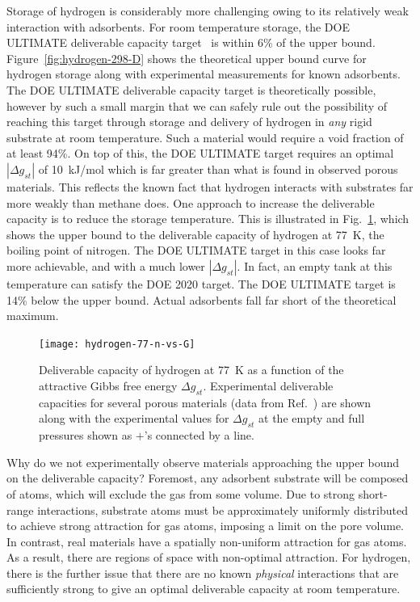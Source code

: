 \documentclass[twoside,twocolumn,9pt]{article}
\newcommand\gst{\ensuremath{\Delta g_{st}}}
\begin{document}
Storage of hydrogen is considerably more challenging owing to its relatively
weak interaction with adsorbents. For room temperature storage, the DOE
ULTIMATE deliverable capacity target~\cite{DOE} is within 6\% of the upper
bound. Figure~\ref{fig:hydrogen-298-D} shows the theoretical upper bound curve
for hydrogen storage along with experimental measurements for known adsorbents. The
DOE ULTIMATE deliverable capacity target is theoretically possible, however by
such a small margin that we can safely rule out the possibility of reaching
this target through storage and delivery of hydrogen in \emph{any} rigid
substrate at room temperature. Such a material would require a void fraction of
at least 94\%. On top of this, the DOE ULTIMATE target requires an optimal
$|\gst|$ of 10~kJ/mol which is far greater than what is found in observed
porous materials. This reflects the known fact that hydrogen interacts with
substrates far more weakly than methane does. 
One approach to increase the deliverable capacity is to reduce the storage
temperature. This is illustrated in Fig.~\ref{fig:hydrogen-77-D}, which shows
the upper bound to the deliverable capacity of hydrogen at 77\ K, the boiling
point of nitrogen. The DOE ULTIMATE target in this case looks far more
achievable, and with a much lower $|\gst|$. In fact, an empty tank at this
temperature can satisfy the DOE 2020 target. The DOE ULTIMATE target is 14\%
below the upper bound. Actual adsorbents fall far short of the theoretical maximum.

\begin{figure}
    \centering
    \texttt{[image: hydrogen-77-n-vs-G]}
    \caption{Deliverable capacity of hydrogen at 77\ K as a function of the attractive Gibbs free energy $\gst$. Experimental deliverable capacities for several porous materials (data from Ref.~\cite{garcia2018benchmark}) are shown along with the experimental values for $\gst$ at the empty and full pressures shown as $+$'s connected by a line.}
    \label{fig:hydrogen-77-D}
\end{figure}

Why do we not experimentally observe materials approaching the upper bound on
the deliverable capacity? Foremost, any adsorbent substrate will be composed of
atoms, which will exclude the gas from some volume. Due to strong short-range
interactions, substrate atoms must be approximately uniformly distributed to achieve strong
attraction for gas atoms, imposing a limit on the pore
volume. In contrast, real materials have a spatially non-uniform attraction for
gas atoms. As a result, there are regions of space with
non-optimal attraction. For hydrogen, there is the further issue that there are
no known \emph{physical} interactions that are sufficiently strong to give an
optimal deliverable capacity at room temperature.
\end{document}
